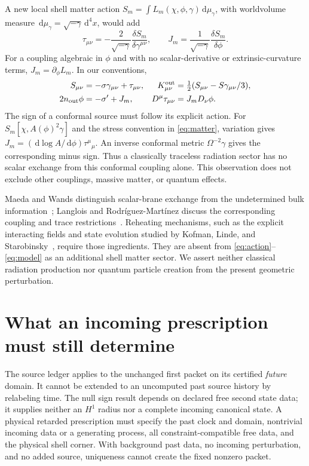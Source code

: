 \documentclass[11pt]{article}
\newcommand{\dd}{\,\mathrm d}
\begin{document}
A new local shell matter action
$S_m=\int L_m(\chi,\phi,\gamma)\dd\mu_\gamma$, with worldvolume measure
$\dd\mu_\gamma=\sqrt{-\gamma}\dd^4x$, would add
\[
 \tau_{\mu\nu}=-\frac{2}{\sqrt{-\gamma}}
               \frac{\delta S_m}{\delta\gamma^{\mu\nu}},
 \qquad J_m=\frac{1}{\sqrt{-\gamma}}\frac{\delta S_m}{\delta\phi}.
\]
For a coupling algebraic in $\phi$ and with no scalar-derivative or
extrinsic-curvature terms, $J_m=\partial_\phi L_m$. In our conventions,
\begin{equation}
\begin{aligned}
 S_{\mu\nu}&=-\sigma\gamma_{\mu\nu}+\tau_{\mu\nu},&
 K^{\rm out}_{\mu\nu}
     &=\tfrac12(S_{\mu\nu}-S\gamma_{\mu\nu}/3),\\
 2n_{\rm out}\phi&=-\sigma'+J_m,&
 D^\mu\tau_{\mu\nu}&=J_m D_\nu\phi.
\end{aligned}
\label{eq:matter}
\end{equation}
The sign of a conformal source must follow its explicit action.
For $S_m[\chi,A(\phi)^2\gamma]$ and the stress convention in
\eqref{eq:matter}, variation gives
$J_m=(\dd\log A/\dd\phi)\tau^\mu{}_\mu$.
An inverse conformal metric $\Omega^{-2}\gamma$ gives the corresponding
minus sign. Thus a classically traceless radiation sector has no scalar
exchange from this conformal coupling alone. This observation does not
exclude other couplings, massive matter, or quantum effects.

Maeda and Wands distinguish scalar-brane exchange from the undetermined
bulk information~\cite{mw}; Langlois and Rodr\'iguez-Mart\'inez discuss
the corresponding coupling and trace restrictions~\cite{lrm}.
Reheating mechanisms, such as the explicit interacting fields and state
evolution studied by Kofman, Linde, and Starobinsky~\cite{kls}, require
those ingredients. They are absent from \eqref{eq:action}--\eqref{eq:model}
as an additional shell matter sector. We assert neither classical
radiation production nor quantum particle creation from the present
geometric perturbation.

\section{What an incoming prescription must still determine}
The source ledger applies to the unchanged first packet on its certified
\emph{future} domain. It cannot be extended to an uncomputed past source
history by relabeling time. The null sign result depends on declared free
second state data; it supplies neither an $H^1$ radius nor a complete
incoming canonical state. A physical retarded prescription must specify
the past clock and domain, nontrivial incoming data or a generating
process, all constraint-compatible free data, and the physical shell
corner. With background past data, no incoming perturbation, and no added
source, uniqueness cannot create the fixed nonzero packet.
\end{document}
